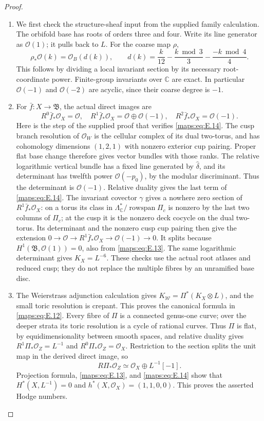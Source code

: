 \begin{proof}
\begin{enumerate}[label=\arabic*.,leftmargin=*]
\item We first check the structure-sheaf input from the supplied family
calculation.  The orbifold base has roots of orders three and four.
Write its line generator as $\mathcal O(1)$; it pulls back to $L$.
For the coarse map $\rho$,
\[
 \rho_*\mathcal O(k)=\mathcal O_B(d(k)),\qquad
 d(k)=\frac{k}{12}-\frac{k\bmod3}{3}
                    -\frac{-k\bmod4}{4}.
 \tag{E.13}\label{maps:eq:E.13}
\]
This follows by dividing a local invariant section by its necessary
root-coordinate power.  Finite-group invariants over $\mathbb C$
are exact.  In particular $\mathcal O(-1)$ and $\mathcal O(-2)$
are acyclic, since their coarse degree is $-1$.

\item For $\bar f:X\to\mathfrak B$, the actual direct images are
\[
 R^0\bar f_*\mathcal O_X=\mathcal O,\quad
 R^1\bar f_*\mathcal O_X=\mathcal O\oplus\mathcal O(-1),
 \quad R^2\bar f_*\mathcal O_X=\mathcal O(-1).
 \tag{E.14}\label{maps:eq:E.14}
\]
Here is the step of the supplied proof that verifies \eqref{maps:eq:E.14}.
The cusp branch resolution of $\mathcal O_W$ is the cellular
complex of its dual two-torus, and has cohomology dimensions
$(1,2,1)$ with nonzero exterior cup pairing.  Proper flat base
change therefore gives vector bundles with those ranks.  The
relative logarithmic vertical bundle has a fixed line generated
by $\widehat\delta$, and its determinant has twelfth power
$\mathcal O(-p_0)$, by the modular discriminant.  Thus the
determinant is $\mathcal O(-1)$.  Relative duality gives the last
term of \eqref{maps:eq:E.14}.  The invariant covector $\gamma$ gives a nowhere
zero section of $R^1\bar f_*\mathcal O_X$: on a torus its class
in $\Lambda^*_{\mathbb C}/\operatorname{rowspan}\Pi_c$ is
nonzero by the last two columns of $\Pi_c$; at the cusp it is
the nonzero deck cocycle on the dual two-torus.  Its determinant
and the nonzero cusp cup pairing then give the extension
$0\to\mathcal O\to R^1\bar f_*\mathcal O_X
\to\mathcal O(-1)\to0$.  It splits because
$H^1(\mathfrak B,\mathcal O(1))=0$, also from \eqref{maps:eq:E.13}.
The same logarithmic determinant gives $K_X=L^{-6}$.
These checks use the actual root atlases and reduced cusp; they
do not replace the multiple fibres by an unramified base disc.

\item The Weierstrass adjunction calculation gives
$K_{\mathscr W}=\Pi^*(K_X\otimes L)$, and the small toric
resolution is crepant.  This proves the canonical formula in
\eqref{maps:eq:E.12}.  Every fibre of $\Pi$ is a connected genus-one curve;
over the deeper strata its toric resolution is a cycle of rational
curves.  Thus $\Pi$ is flat, by equidimensionality between smooth
spaces, and relative duality gives
$R^1\Pi_*\mathcal O_Z=L^{-1}$ and
$R^0\Pi_*\mathcal O_Z=\mathcal O_X$.
Restriction to the section splits the unit map in the derived
direct image, so
\[
 R\Pi_*\mathcal O_Z\simeq
 \mathcal O_X\oplus L^{-1}[-1].
\]
Projection formula, \eqref{maps:eq:E.13}, and \eqref{maps:eq:E.14} show that
$H^*(X,L^{-1})=0$ and $h^*(X,\mathcal O_X)=(1,1,0,0)$.
This proves the asserted Hodge numbers.


\end{enumerate}
\end{proof}
